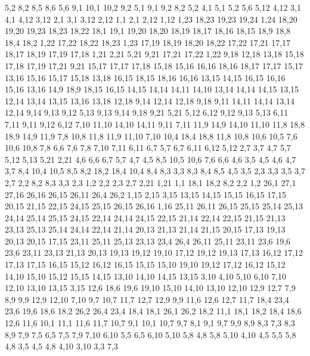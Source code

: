 %
5,2
8,2
8,5
8,6
5,6
%
9,1
10,1
10,2
9,2
%
5,1
9,1
9,2
8,2
5,2
%
4,1
5,1
5,2
5,6
5,12
4,12
%
3,1
4,1
4,12
3,12
%
2,1
3,1
3,12
2,12
%
1,1
2,1
2,12
1,12
1,23
18,23
19,23
19,24
1,24
%
18,20
19,20
19,23
18,23
18,22
%
18,1
19,1
19,20
18,20
18,19
18,17
18,16
18,15
18,9
18,8
18,4
18,2
%
1,22
17,22
18,22
18,23
1,23
%
17,19
18,19
18,20
18,22
17,22
17,21
%
17,17
18,17
18,19
17,19
17,18
%
1,21
2,21
5,21
9,21
17,21
17,22
1,22
%
9,18
12,18
13,18
15,18
17,18
17,19
17,21
9,21
%
15,17
17,17
17,18
15,18
%
15,16
16,16
18,16
18,17
17,17
15,17
%
13,16
15,16
15,17
15,18
13,18
%
16,15
18,15
18,16
16,16
%
13,15
14,15
16,15
16,16
15,16
13,16
%
14,9
18,9
18,15
16,15
14,15
14,14
14,11
14,10
%
13,14
14,14
14,15
13,15
%
12,14
13,14
13,15
13,16
13,18
12,18
%
9,14
12,14
12,18
9,18
%
9,11
14,11
14,14
13,14
12,14
9,14
9,13
9,12
%
5,13
9,13
9,14
9,18
9,21
5,21
%
5,12
6,12
9,12
9,13
5,13
%
6,11
7,11
9,11
9,12
6,12
%
7,10
11,10
14,10
14,11
9,11
7,11
%
11,9
14,9
14,10
11,10
%
11,8
18,8
18,9
14,9
11,9
%
7,8
10,8
11,8
11,9
11,10
7,10
%
10,4
18,4
18,8
11,8
10,8
10,6
10,5
%
7,6
10,6
10,8
7,8
%
6,6
7,6
7,8
7,10
7,11
6,11
6,7
%
5,7
6,7
6,11
6,12
5,12
%
2,7
3,7
4,7
5,7
5,12
5,13
5,21
2,21
%
4,6
6,6
6,7
5,7
4,7
%
4,5
8,5
10,5
10,6
7,6
6,6
4,6
%
3,5
4,5
4,6
4,7
3,7
%
8,4
10,4
10,5
8,5
%
8,2
18,2
18,4
10,4
8,4
8,3
%
3,3
8,3
8,4
8,5
4,5
3,5
%
2,3
3,3
3,5
3,7
2,7
%
2,2
8,2
8,3
3,3
2,3
%
1,2
2,2
2,3
2,7
2,21
1,21
%
1,1
18,1
18,2
8,2
2,2
1,2
26,1
27,1
27,16
26,16
26,15
26,11
26,4
26,2
%
1,15
2,15
3,15
13,15
14,15
15,15
16,15
17,15
20,15
21,15
22,15
24,15
25,15
26,15
26,16
1,16
%
25,11
26,11
26,15
25,15
25,14
25,13
%
24,14
25,14
25,15
24,15
%
22,14
24,14
24,15
22,15
%
21,14
22,14
22,15
21,15
%
21,13
23,13
25,13
25,14
24,14
22,14
21,14
%
20,13
21,13
21,14
21,15
20,15
%
17,13
19,13
20,13
20,15
17,15
%
23,11
25,11
25,13
23,13
%
23,4
26,4
26,11
25,11
23,11
23,6
%
19,6
23,6
23,11
23,13
21,13
20,13
19,13
19,12
19,10
%
17,12
19,12
19,13
17,13
%
16,12
17,12
17,13
17,15
16,15
%
15,12
16,12
16,15
15,15
%
15,10
19,10
19,12
17,12
16,12
15,12
%
14,10
15,10
15,12
15,15
14,15
%
13,10
14,10
14,15
13,15
%
3,10
4,10
5,10
6,10
7,10
12,10
13,10
13,15
3,15
%
12,6
18,6
19,6
19,10
15,10
14,10
13,10
12,10
12,9
12,7
%
7,9
8,9
9,9
12,9
12,10
7,10
%
9,7
10,7
11,7
12,7
12,9
9,9
%
11,6
12,6
12,7
11,7
%
18,4
23,4
23,6
19,6
18,6
%
18,2
26,2
26,4
23,4
18,4
%
18,1
26,1
26,2
18,2
%
11,1
18,1
18,2
18,4
18,6
12,6
11,6
%
10,1
11,1
11,6
11,7
10,7
%
9,1
10,1
10,7
9,7
%
8,1
9,1
9,7
9,9
8,9
8,3
%
7,3
8,3
8,9
7,9
7,5
%
6,5
7,5
7,9
7,10
6,10
%
5,5
6,5
6,10
5,10
5,8
%
4,8
5,8
5,10
4,10
%
4,5
5,5
5,8
4,8
%
3,5
4,5
4,8
4,10
3,10
%
3,3
7,3
